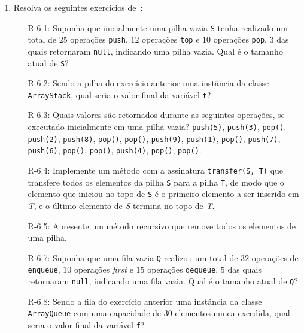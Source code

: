 \medskip


\begin{enumerate}
	\item Resolva os seguintes exercícios de~\cite{GoodrichEtAl2014}:

	\begin{itemize}
		\item[R-6.1:] Suponha que inicialmente uma pilha vazia \texttt{S} tenha realizado um total de $25$ operações \texttt{push}, $12$ operações \texttt{top} e $10$ operações \texttt{pop}, $3$ das quais retornaram \texttt{null}, indicando uma pilha vazia. Qual é o tamanho atual de \texttt{S}?
		
		\item[R-6.2:] Sendo a pilha do exercício anterior uma instância da classe \texttt{ArrayStack}, qual seria o valor final da variável \texttt{t}? 
		
		\item[R-6.3:] Quais valores são retornados durante as seguintes operações, se executado inicialmente em uma pilha vazia? \texttt{push(5)}, \texttt{push(3)}, \texttt{pop()}, \texttt{push(2)}, \texttt{push(8)}, \texttt{pop()}, \texttt{pop()}, \texttt{push(9)}, \texttt{push(1)}, \texttt{pop()}, \texttt{push(7)}, \texttt{push(6)}, \texttt{pop()}, \texttt{pop()}, \texttt{push(4)}, \texttt{pop()}, \texttt{pop()}.
		
		\item[R-6.4:] Implemente um método com a assinatura \texttt{transfer(S, T)} que transfere todos os elementos da pilha \texttt{S} para a pilha \texttt{T}, de modo que o elemento que iniciou no topo de \texttt{S} é o primeiro elemento a ser inserido em \textsl{T}, e o último elemento de \textsl{S} termina no topo de \textsl{T}.
		
		\item[R-6.5:] Apresente um método recursivo que remove todos os elementos de uma pilha.
		
		\item[R-6.7:] Suponha que uma fila vazia \texttt{Q} realizou um total de $32$ operações de \texttt{enqueue}, $10$ operações \textit{first} e $15$ operações \texttt{dequeue}, $5$ das quais retornaram \texttt{null}, indicando uma fila vazia. Qual é o tamanho atual de \texttt{Q}?
		
		\item[R-6.8:] Sendo a fila do exercício anterior uma instância da classe \texttt{ArrayQueue} com uma capacidade de $30$ elementos nunca excedida, qual seria o valor final da variável \texttt{f}?
		

\end{itemize}
\end{enumerate}
